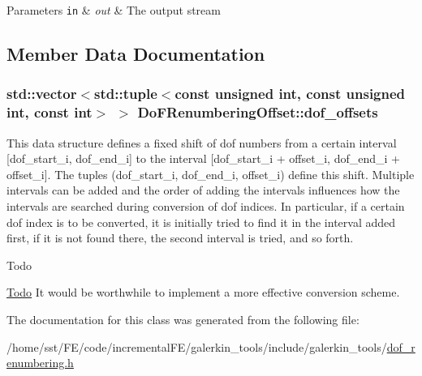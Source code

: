 \begin{DoxyParams}[1]{Parameters}
\mbox{\tt in}  & {\em out} & The output stream \\
\hline
\end{DoxyParams}


\subsection{Member Data Documentation}
\subsubsection[{\texorpdfstring{dof\+\_\+offsets}{dof_offsets}}]{\setlength{\rightskip}{0pt plus 5cm}std\+::vector$<$std\+::tuple$<$const unsigned int, const unsigned int, const int$>$ $>$ Do\+F\+Renumbering\+Offset\+::dof\+\_\+offsets\hspace{0.3cm}{\ttfamily [private]}}\hypertarget{class_do_f_renumbering_offset_a5df6c4b70b1394c3670ced634146c9a9}{}\label{class_do_f_renumbering_offset_a5df6c4b70b1394c3670ced634146c9a9}
This data structure defines a fixed shift of dof numbers from a certain interval \mbox{[}dof\+\_\+start\+\_\+i, dof\+\_\+end\+\_\+i\mbox{]} to the interval \mbox{[}dof\+\_\+start\+\_\+i + offset\+\_\+i, dof\+\_\+end\+\_\+i + offset\+\_\+i\mbox{]}. The tuples (dof\+\_\+start\+\_\+i, dof\+\_\+end\+\_\+i, offset\+\_\+i) define this shift. Multiple intervals can be added and the order of adding the intervals influences how the intervals are searched during conversion of dof indices. In particular, if a certain dof index is to be converted, it is initially tried to find it in the interval added first, if it is not found there, the second interval is tried, and so forth.\begin{DoxyRefDesc}{Todo}
\item[\hyperlink{todo__todo000009}{Todo}]It would be worthwhile to implement a more effective conversion scheme. \end{DoxyRefDesc}


The documentation for this class was generated from the following file\+:\begin{DoxyCompactItemize}
\item 
/home/sst/\+F\+E/code/incremental\+F\+E/galerkin\+\_\+tools/include/galerkin\+\_\+tools/\hyperlink{dof__renumbering_8h}{dof\+\_\+renumbering.\+h}\end{DoxyCompactItemize}
